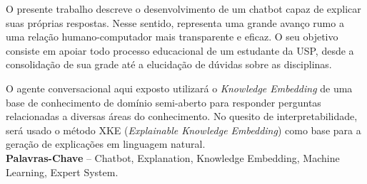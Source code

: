 \documentclass[]{politex}
\begin{document}
\capa
\folhaderosto













\begin{resumo}
O presente trabalho descreve o desenvolvimento de um chatbot capaz de explicar suas próprias respostas. Nesse sentido, representa uma grande avanço rumo a uma relação humano-computador mais transparente e eficaz. O seu objetivo consiste em apoiar todo processo educacional de um estudante da USP, desde a consolidação de sua grade até a elucidação de dúvidas sobre as disciplinas. 

O agente conversacional aqui exposto utilizará o \textit{Knowledge Embedding} de uma base de conhecimento de domínio semi-aberto para responder perguntas relacionadas a diversas áreas do conhecimento. No quesito de interpretabilidade, será usado o método XKE (\textit{Explainable Knowledge Embedding}) como base para a geração de explicações em linguagem natural.
%
\\[3\baselineskip]
%
\textbf{Palavras-Chave} -- Chatbot, Explanation, Knowledge Embedding, Machine Learning, Expert System.
\end{resumo}


%
%
\end{document}
